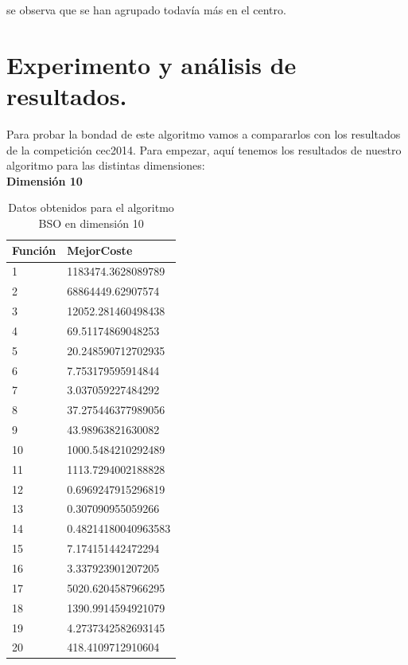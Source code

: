 se observa que se han agrupado todavía más en el centro. 


\section{Experimento y análisis de resultados.}

Para probar la bondad de este algoritmo vamos a compararlos con los resultados de la competición cec2014. Para empezar, aquí tenemos los resultados de nuestro algoritmo para las distintas dimensiones:\\

\textbf{Dimensión 10}

\begin{table}[htbp]
	\begin{center}
		\begin{tabular}{|l|l|}
			\hline
			Función & MejorCoste \\
			\hline \hline
			1 & 1183474.3628089789\\ \hline
			2 & 68864449.62907574 \\ \hline
			3 & 12052.281460498438 \\ \hline
			4 & 69.51174869048253 \\ \hline
			5 & 20.248590712702935 \\ \hline
			6 & 7.753179595914844 \\ \hline
			7 & 3.037059227484292 \\ \hline
			8 & 37.275446377989056 \\ \hline
			9 & 43.98963821630082 \\ \hline
			10 & 1000.5484210292489 \\ \hline
			11 & 1113.7294002188828 \\ \hline
			12 & 0.6969247915296819 \\ \hline
			13 & 0.307090955059266 \\ \hline
			14 & 0.48214180040963583 \\ \hline
			15 & 7.174151442472294 \\ \hline
			16 & 3.337923901207205 \\ \hline
			17 & 5020.6204587966295 \\ \hline
			18 & 1390.9914594921079 \\ \hline
			19 & 4.2737342582693145 \\ \hline
			20 & 418.4109712910604 \\ \hline
			
		\end{tabular}
		\caption{Datos obtenidos para el algoritmo BSO en dimensión 10}
		\label{tabla:Dimension10}
	\end{center}
\end{table}

